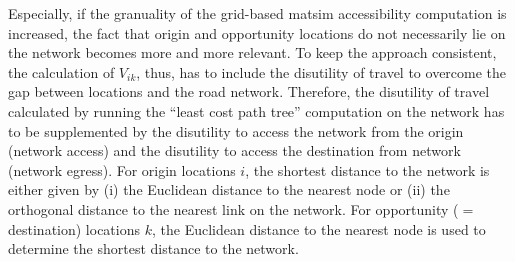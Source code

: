 
Especially, if the granuality of the grid-based \gls{matsim} accessibility computation is increased, the fact that 
origin and opportunity locations do not necessarily lie on the network becomes more and more relevant. To keep the 
approach consistent, the calculation of $V_{ik}$, thus, has to include the disutility of travel to overcome the gap 
between locations and the road network. Therefore, the disutility of travel calculated by running the ``least cost 
path tree'' computation on the network has to be supplemented by the disutility to access the network from the origin 
(network access) and the disutility to access the destination from network (network egress). For origin locations $i$, 
the shortest distance to the network is either given by (i) the Euclidean distance to the nearest node or (ii) the 
orthogonal distance to the nearest link on the network.
For opportunity ($=$ destination) locations $k$, the Euclidean distance to the nearest node is used to determine
the shortest distance to the network.

%


